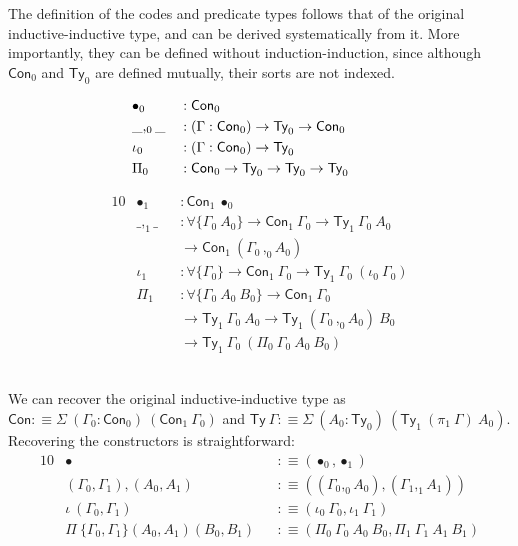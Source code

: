 \documentclass[a4paper,UKenglish,cleveref, autoref, thm-restate]{lipics-v2019}
\newcommand{\GG}{\Gamma}
\begin{document}
The definition of the codes and predicate types follows that of the original
inductive-inductive type, and can be derived systematically from it. More
importantly, they can be defined without induction-induction, since although
$\textsf{Con}_0$ and $\textsf{Ty}_0$ are defined mutually, their sorts are not
indexed. \\
\begin{minipage}{0.4\textwidth}
\begin{alignat*}{10}
  & \bullet_0 && : \textsf{Con}_0 \\
  & \_,_0\_ && : (\GG : \textsf{Con}_0) \to \textsf{Ty}_0 \to \textsf{Con}_0 \\
  & \iota_0 && : (\GG : \textsf{Con}_0) \to \textsf{Ty}_0 \\
  & \Pi_0 && : \textsf{Con}_0 \to \textsf{Ty}_0 \to \textsf{Ty}_0 \to \textsf{Ty}_0 \hspace{2.8em} \\
\end{alignat*}
\end{minipage}
\begin{minipage}{0.5\textwidth}
\vspace{-1.3em}
\begin{alignat*}{10}
  & \bullet_1 && : \textsf{Con}_1\ \bullet_0 \\
  & \_,_1\_ && : \forall\{\GG_0\ A_0\} \to \textsf{Con}_1\ \GG_0 \to \textsf{Ty}_1\ \GG_0\ A_0 \\
  & && \to \textsf{Con}_1\ (\GG_0 \,,_0 A_0) \\
  & \iota_1 && : \forall\{\GG_0\} \to \textsf{Con}_1\ \GG_0 \to \textsf{Ty}_1\ \GG_0\ (\iota_0\ \GG_0) \\
  & \Pi_1 && : \forall\{\GG_0\ A_0\ B_0\} \to \textsf{Con}_1\ \GG_0 \\
  & && \to \textsf{Ty}_1\ \GG_0\ A_0 \to \textsf{Ty}_1\ (\GG_0\, ,_0 A_0)\ B_0 \\
  & && \to \textsf{Ty}_1\ \GG_0\ (\Pi_0\ \GG_0\ A_0\ B_0)
\end{alignat*}
\end{minipage}
\\

We can recover the original inductive-inductive type as $\textsf{Con} :\equiv
\Sigma\ (\GG_0 : \textsf{Con}_0)\ (\textsf{Con}_1\ \GG_0)$ and $\textsf{Ty}\ \GG
:\equiv \Sigma\ (A_0 :
\textsf{Ty}_0)\ (\textsf{Ty}_1\ (\pi_1\ \GG)\ A_0)$. Recovering the constructors
is straightforward:
\begin{alignat*}{10}
  & \bullet && :\equiv (\bullet_0 , \bullet_1) \\
  & (\GG_0 , \GG_1) , (A_0 , A_1) && :\equiv ((\GG_0 \mathbin{,_0} A_0) , (\GG_1 ,_1 A_1)) \\
  & \iota\ (\GG_0 , \GG_1) && :\equiv (\iota_0\ \GG_0 , \iota_1\ \GG_1) \\
  & \Pi\ \{\GG_0 , \GG_1\}(A_0 , A_1) (B_0 , B_1) && :\equiv
    (\Pi_0\ \GG_0\ A_0\ B_0 , \Pi_1\ \GG_1\ A_1\ B_1)
\end{alignat*}
\end{document}

